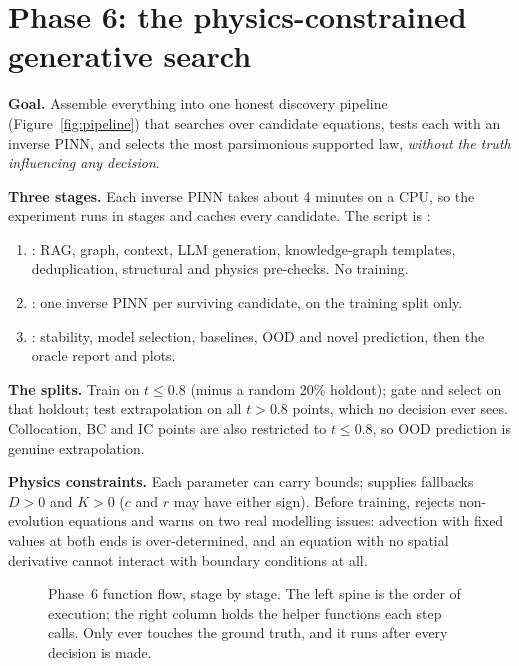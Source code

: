 \section{Phase 6: the physics-constrained generative search}\label{sec:p6}

\textbf{Goal.} Assemble everything into one honest discovery pipeline (Figure~\ref{fig:pipeline}) that searches
over candidate equations, tests each with an inverse PINN, and selects the most parsimonious supported law,
\emph{without the truth influencing any decision}.

\textbf{Three stages.} Each inverse PINN takes about 4 minutes on a CPU, so the experiment runs in stages and
caches every candidate. The script is :
\begin{enumerate}
  \item {}: RAG, graph, context, LLM generation, knowledge-graph templates, deduplication,
        structural and physics pre-checks. No training.
  \item {}: one inverse PINN per surviving candidate, on the training split only.
  \item {}: stability, model selection, baselines, OOD and novel prediction, then the oracle
        report and plots.
\end{enumerate}

\textbf{The splits.} Train on $t\le0.8$ (minus a random 20\% holdout); gate and select on that holdout; test
extrapolation on all $t>0.8$ points, which no decision ever sees. Collocation, BC and IC points are also
restricted to $t\le0.8$, so OOD prediction is genuine extrapolation.

\textbf{Physics constraints.} Each parameter can carry bounds;  supplies fallbacks $D>0$ and
$K>0$ ($c$ and $r$ may have either sign). Before training,  rejects non-evolution equations
and warns on two real modelling issues: advection with fixed values at both ends is over-determined, and an
equation with no spatial derivative cannot interact with boundary conditions at all.

\begin{figure}[p]
\centering

\pkglegend
\caption{Phase~6 function flow, stage by stage. The left spine is the order of execution; the right column holds
the helper functions each step calls. Only  ever touches the ground truth, and it runs
after every decision is made.}
\label{fig:p6}
\end{figure}

